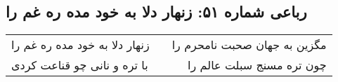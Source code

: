 \begin{center}
\section*{رباعی شماره ۵۱: زنهار دلا به خود مده ره غم را}
\label{sec:0051}
\begin{longtable}{l p{0.5cm} r}
زنهار دلا به خود مده ره غم را
&&
مگزین به جهان صحبت نامحرم را
\\
با تره و نانی چو قناعت کردی
&&
چون تره مسنج سبلت عالم را
\\
\end{longtable}
\end{center}
